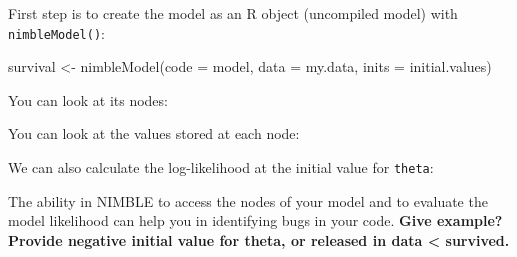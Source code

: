 \documentclass[
  12pt,
]{krantz}
\newenvironment{Shaded}{\begin{snugshade}}{\end{snugshade}}
\newcommand{\AttributeTok}[1]{\textcolor[rgb]{0.77,0.63,0.00}{#1}}
\newcommand{\CommentTok}[1]{\textcolor[rgb]{0.56,0.35,0.01}{\textit{#1}}}
\newcommand{\DocumentationTok}[1]{\textcolor[rgb]{0.56,0.35,0.01}{\textbf{\textit{#1}}}}
\newcommand{\FunctionTok}[1]{\textcolor[rgb]{0.00,0.00,0.00}{#1}}
\newcommand{\NormalTok}[1]{#1}
\newcommand{\OtherTok}[1]{\textcolor[rgb]{0.56,0.35,0.01}{#1}}
\newcommand{\SpecialCharTok}[1]{\textcolor[rgb]{0.00,0.00,0.00}{#1}}
\begin{document}
First step is to create the model as an R object (uncompiled model) with \texttt{nimbleModel()}:

\begin{Shaded}
\begin{Highlighting}[]
\NormalTok{survival }\OtherTok{\textless{}{-}} \FunctionTok{nimbleModel}\NormalTok{(}\AttributeTok{code =}\NormalTok{ model,}
                        \AttributeTok{data =}\NormalTok{ my.data,}
                        \AttributeTok{inits =}\NormalTok{ initial.values)}
\end{Highlighting}
\end{Shaded}

You can look at its nodes:

\begin{Shaded}
\end{Shaded}

You can look at the values stored at each node:

\begin{Shaded}
\end{Shaded}

We can also calculate the log-likelihood at the initial value for \texttt{theta}:

\begin{Shaded}
\end{Shaded}

The ability in NIMBLE to access the nodes of your model and to evaluate the model likelihood can help you in identifying bugs in your code. \textbf{Give example? Provide negative initial value for theta, or released in data \textless{} survived.}
\end{document}
